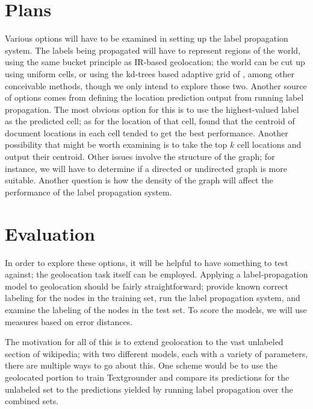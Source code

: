 \documentclass[11pt]{article}
\begin{document}
\section{Plans}
\par
Various options will have to be examined in setting up the label propagation system.
The labels being propagated will have to represent regions of the world, using
the same bucket principle as IR-based geolocation; the world can be cut up
using uniform cells, or using the kd-trees based adaptive grid of
\cite{rolleretal:12}, among other conceivable methods, though we only intend to
explore those two.
Another source of options comes from defining the location prediction output
from running label propagation.
The most obvious option for this is to use the highest-valued label as the predicted cell;
as for the location of that cell, \cite{rolleretal:12} found that the centroid
of document locations in each cell tended to get the best performance.
Another possibility that might be worth examining is to take the top $k$ cell
locations and output their centroid.
Other issues involve the structure of the graph; for instance, we will have to
determine if a directed or undirected graph is more suitable.
Another question is how the density of the graph will affect the performance of
the label propagation system. %
\par

\section{Evaluation}
In order to explore these options, it will be helpful to have something to test against;
the geolocation task itself can be employed.
Applying a label-propagation model to geolocation should be fairly straightforward; 
provide known correct labeling for the nodes in the training set, run the label
propagation system, and examine the labeling of the nodes in the test set.
To score the models, we will use measures based on error distances.
\par
The motivation for all of this is to extend geolocation to the vast unlabeled
section of wikipedia; with two different models, each with a variety of
parameters, there are multiple ways to go about this.
One scheme would be to use the geolocated portion to train Textgrounder and
compare its predictions for the unlabeled set to the predictions yielded by
running label propagation over the combined sets.



\end{document}
